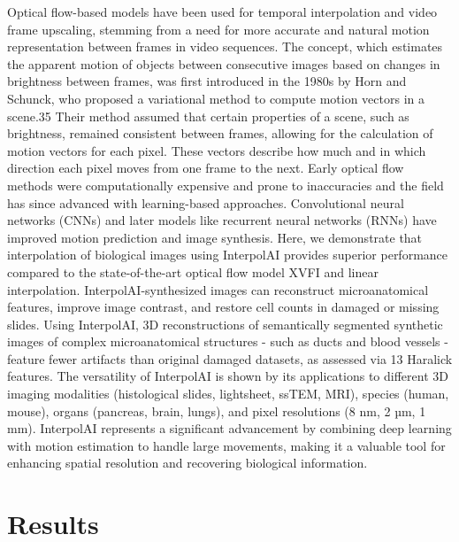 \begin{refsection}
    Optical flow-based models have been used for temporal interpolation and video frame upscaling, stemming from a need for more accurate and natural motion representation between frames in video sequences. The concept, which estimates the apparent motion of objects between consecutive images based on changes in brightness between frames, was first introduced in the 1980s by Horn and Schunck, who proposed a variational method to compute motion vectors in a scene.35 Their method assumed that certain properties of a scene, such as brightness, remained consistent between frames, allowing for the calculation of motion vectors for each pixel. These vectors describe how much and in which direction each pixel moves from one frame to the next. Early optical flow methods were computationally expensive and prone to inaccuracies and the field has since advanced with learning-based approaches. Convolutional neural networks (CNNs) and later models like recurrent neural networks (RNNs) have improved motion prediction and image synthesis\cite{hu2018a,hui2021a}.
    Here, we demonstrate that interpolation of biological images using InterpolAI provides superior performance compared to the state-of-the-art optical flow model XVFI\cite{sim2021a} and linear interpolation. InterpolAI-synthesized images can reconstruct microanatomical features, improve image contrast, and restore cell counts in damaged or missing slides. Using InterpolAI, 3D reconstructions of semantically segmented synthetic images of complex microanatomical structures - such as ducts and blood vessels - feature fewer artifacts than original damaged datasets, as assessed via 13 Haralick features. The versatility of InterpolAI is shown by its applications to different 3D imaging modalities (histological slides, lightsheet, ssTEM, MRI), species (human, mouse), organs (pancreas, brain, lungs), and pixel resolutions (8 nm, 2 µm, 1 mm). InterpolAI represents a significant advancement by combining deep learning with motion estimation to handle large movements, making it a valuable tool for enhancing spatial resolution and recovering biological information.
    
    \section{Results}

\end{refsection}
